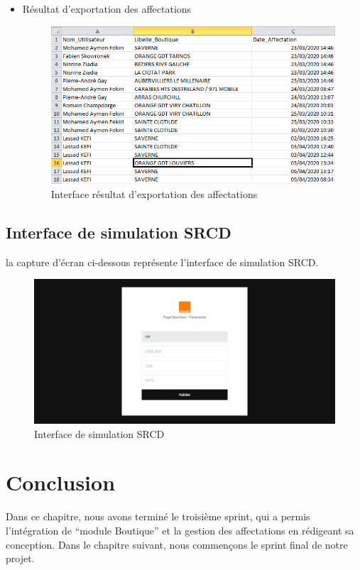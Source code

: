 \begin{itemize}
	\item Résultat d'exportation des affectations
	\begin{figure}[H]
		\centering
		\includegraphics[width=0.7\linewidth]{"img/screenshots/affectation users-boutique/export"}
		\caption[Interface résultat d'exportation des affectations]{Interface résultat d'exportation des affectations}
		\label{fig:export-affectation}
	\end{figure}
\end{itemize}
\subsection{Interface de simulation SRCD}
la capture d'écran ci-dessous représente l’interface de simulation SRCD.
\begin{figure}[H]
	\centering
	\includegraphics[width=0.7\linewidth]{"img/screenshots/logs + srcd/screencapture-localhost-pano-pfe-panoramix-public-srcd-phtml-2020-06-11-18_18_04"}
	\caption[Interface de simulation SRCD]{Interface de simulation SRCD}
	\label{fig:srcd}
\end{figure}

\section*{Conclusion}
Dans ce chapitre, nous avons terminé le troisième sprint, qui a permis l'intégration de “module Boutique” et la gestion des affectations en rédigeant sa conception. Dans le chapitre suivant, nous commençons le sprint final de notre projet.
